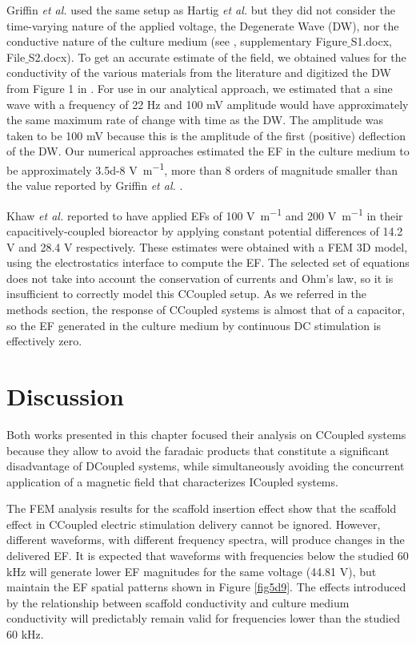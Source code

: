 Griffin \textit{et al.} \cite{Griffin2011-bb} used the same setup as Hartig \textit{et al.} but they did not consider the time-varying nature of the applied voltage, the Degenerate Wave (DW), nor the conductive nature of the culture medium (see \cite{Griffin2013-wp}, supplementary Figure$\_$S1.docx, File$\_$S2.docx). To get an accurate estimate of the field, we obtained values for the conductivity of the various materials from the literature and digitized the DW from Figure 1 in \cite{Griffin2013-wp}. For use in our analytical approach, we estimated that a sine wave with a frequency of 22 \si{\hertz} and 100 \si{\milli\volt} amplitude would have approximately the same maximum rate of change with time as the DW. The amplitude was taken to be 100 \si{\milli\volt} because this is the amplitude of the first (positive) deflection of the DW. Our numerical approaches estimated the \acs{EF} in the culture medium to be approximately \num{3.5d-8} \si{\volt\per\meter}, more than 8 orders of magnitude smaller than the value reported by Griffin \textit{et al.} \cite{Griffin2011-bb}.

Khaw \textit{et al.} \cite{Khaw2021-tv} reported to have applied \acs{EF}s of \num{100} \si{\volt\per\meter} and \num{200} \si{\volt\per\meter} in their capacitively-coupled bioreactor by applying constant potential differences of 14.2 \si{\volt} and 28.4 \si{\volt} respectively. These estimates were obtained with a \acs{FEM} \acs{3D} model, using the electrostatics interface to compute the \acs{EF}. The selected set of equations does not take into account the conservation of currents and Ohm's law, so it is insufficient to correctly model this \acs{CCoupled} setup. As we referred in the methods section, the response of \acs{CCoupled} systems is almost that of a capacitor, so the \acs{EF} generated in the culture medium by continuous \acs{DC} stimulation is effectively zero.




\newpage
\section{Discussion}

Both works presented in this chapter focused their analysis on \acs{CCoupled} systems because they allow to avoid the faradaic products that constitute a significant disadvantage of \acs{DCoupled} systems, while simultaneously avoiding the concurrent application of a magnetic field that characterizes \acs{ICoupled} systems.

The \acs{FEM} analysis results for the scaffold insertion effect show that the scaffold effect in \acs{CCoupled} electric stimulation delivery cannot be ignored. However, different waveforms, with different frequency spectra, will produce changes in the delivered \acs{EF}. It is expected that waveforms with frequencies below the studied 60 \si{\kilo\hertz} will generate lower \acs{EF} magnitudes for the same voltage (44.81 \si{\volt}), but maintain the \acs{EF} spatial patterns shown in Figure \ref{fig5d9}. The effects introduced by the relationship between scaffold conductivity and culture medium conductivity will predictably remain valid for frequencies lower than the studied 60 \si{\kilo\hertz}.

